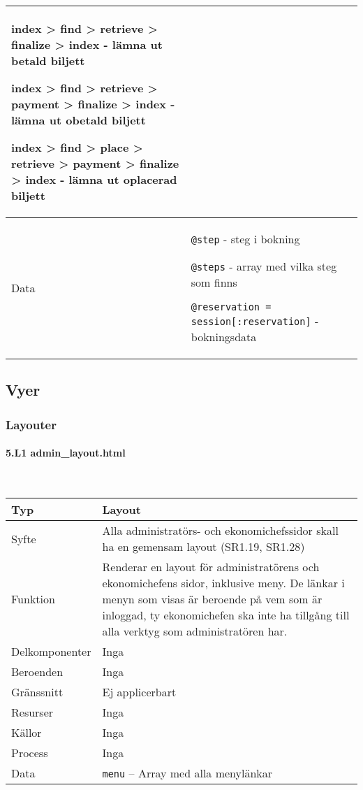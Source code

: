 \documentclass[a4paper, twoside, 11pt, titlepage]{article}
\begin{document}
\begin {table} [ht]
\begin{tabular} {  p{3.5cm} p{9.6cm} }
{index > find > retrieve > finalize > index - lämna ut betald biljett

index > find > retrieve > payment > finalize > index - lämna ut obetald biljett

index > find > place > retrieve > payment > finalize > index - lämna ut oplacerad biljett} \\
				\hline
				{Data} & {{\tt @step} - steg i bokning

{\tt @steps} - array med vilka steg som finns

{\tt @reservation = session[:reservation]} - bokningsdata} \\
				\hline
			\end{tabular} \end{table} \FloatBarrier


	\subsection{Vyer}



		\subsubsection{Layouter}



			\paragraph{5.L1 admin\_layout.html}\

			\begin {table} [ht] \begin{tabular} {  p{3.5cm} p{9.6cm} }
				\hline
				{Typ} & {Layout} \\
				\hline
				{Syfte} & {Alla administratörs- och ekonomichefssidor skall ha en gemensam layout (SR1.19, SR1.28)} \\
				\hline
				{Funktion} & {Renderar en layout för administratörens och ekonomichefens sidor, inklusive meny. De länkar i menyn som visas är beroende på vem som är inloggad, ty ekonomichefen ska inte ha tillgång till alla verktyg som administratören har.} \\
				\hline
				{Delkomponenter} & {Inga} \\
				\hline
				{Beroenden} & {Inga} \\
				\hline
				{Gränssnitt} & {Ej applicerbart} \\
				\hline
				{Resurser} & {Inga} \\
				\hline
				{Källor} & {Inga} \\
				\hline
				{Process} & {Inga} \\
				\hline
				{Data} & {{\tt menu} – Array med alla menylänkar} \\
				\hline
			\end{tabular} \end{table} \FloatBarrier
\end{document}
